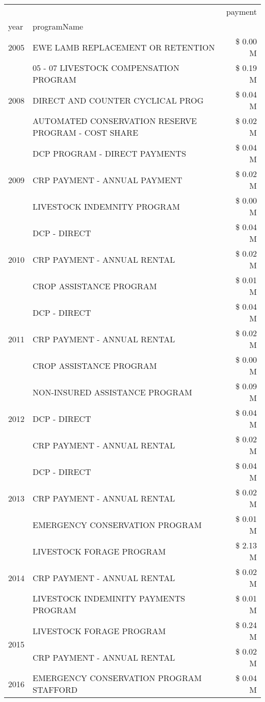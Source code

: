 \begin{tabular}{llr}
\toprule
 &  & payment \\
year & programName &  \\
\midrule
2005 & EWE LAMB REPLACEMENT OR RETENTION & \$ 0.00 M \\
\cline{1-3}
\multirow[t]{3}{*}{2008} & 05 - 07 LIVESTOCK COMPENSATION PROGRAM & \$ 0.19 M \\
 & DIRECT AND COUNTER CYCLICAL PROG & \$ 0.04 M \\
 & AUTOMATED CONSERVATION RESERVE PROGRAM - COST SHARE & \$ 0.02 M \\
\cline{1-3}
\multirow[t]{3}{*}{2009} & DCP PROGRAM - DIRECT PAYMENTS & \$ 0.04 M \\
 & CRP PAYMENT - ANNUAL PAYMENT & \$ 0.02 M \\
 & LIVESTOCK INDEMNITY PROGRAM & \$ 0.00 M \\
\cline{1-3}
\multirow[t]{3}{*}{2010} & DCP - DIRECT & \$ 0.04 M \\
 & CRP PAYMENT - ANNUAL RENTAL & \$ 0.02 M \\
 & CROP ASSISTANCE PROGRAM & \$ 0.01 M \\
\cline{1-3}
\multirow[t]{3}{*}{2011} & DCP - DIRECT & \$ 0.04 M \\
 & CRP PAYMENT - ANNUAL RENTAL & \$ 0.02 M \\
 & CROP ASSISTANCE PROGRAM & \$ 0.00 M \\
\cline{1-3}
\multirow[t]{3}{*}{2012} & NON-INSURED ASSISTANCE PROGRAM & \$ 0.09 M \\
 & DCP - DIRECT & \$ 0.04 M \\
 & CRP PAYMENT - ANNUAL RENTAL & \$ 0.02 M \\
\cline{1-3}
\multirow[t]{3}{*}{2013} & DCP - DIRECT & \$ 0.04 M \\
 & CRP PAYMENT - ANNUAL RENTAL & \$ 0.02 M \\
 & EMERGENCY CONSERVATION PROGRAM & \$ 0.01 M \\
\cline{1-3}
\multirow[t]{3}{*}{2014} & LIVESTOCK FORAGE PROGRAM & \$ 2.13 M \\
 & CRP PAYMENT - ANNUAL RENTAL & \$ 0.02 M \\
 & LIVESTOCK INDEMINITY PAYMENTS PROGRAM & \$ 0.01 M \\
\cline{1-3}
\multirow[t]{2}{*}{2015} & LIVESTOCK FORAGE PROGRAM & \$ 0.24 M \\
 & CRP PAYMENT - ANNUAL RENTAL & \$ 0.02 M \\
\cline{1-3}
\multirow[t]{3}{*}{2016} & EMERGENCY CONSERVATION PROGRAM STAFFORD & \$ 0.04 M \\

\end{tabular}
